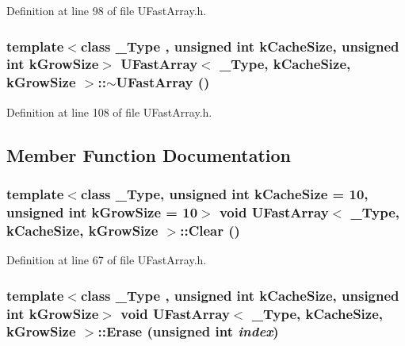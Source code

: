 Definition at line 98 of file UFastArray.h.\hypertarget{class_u_fast_array_6a643fc3aadc7114f343efdd5ddf9976}{
\subsubsection[{$\sim$UFastArray}]{\setlength{\rightskip}{0pt plus 5cm}template$<$class \_\-Type , unsigned int kCacheSize, unsigned int kGrowSize$>$ {\bf UFastArray}$<$ \_\-Type, kCacheSize, kGrowSize $>$::$\sim${\bf UFastArray} ()}}
\label{class_u_fast_array_6a643fc3aadc7114f343efdd5ddf9976}




Definition at line 108 of file UFastArray.h.

\subsection{Member Function Documentation}
\hypertarget{class_u_fast_array_97c6c9910cc6e541254eaaaa530d48a9}{
\subsubsection[{Clear}]{\setlength{\rightskip}{0pt plus 5cm}template$<$class \_\-Type, unsigned int kCacheSize = 10, unsigned int kGrowSize = 10$>$ void {\bf UFastArray}$<$ \_\-Type, kCacheSize, kGrowSize $>$::Clear ()}}
\label{class_u_fast_array_97c6c9910cc6e541254eaaaa530d48a9}




Definition at line 67 of file UFastArray.h.\hypertarget{class_u_fast_array_eef6f5a281cb95cf277c33714117ab05}{
\subsubsection[{Erase}]{\setlength{\rightskip}{0pt plus 5cm}template$<$class \_\-Type , unsigned int kCacheSize, unsigned int kGrowSize$>$ void {\bf UFastArray}$<$ \_\-Type, kCacheSize, kGrowSize $>$::Erase (unsigned int {\em index})}}
\label{class_u_fast_array_eef6f5a281cb95cf277c33714117ab05}




